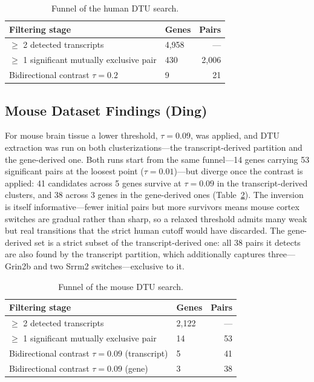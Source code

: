 \begin{table}[htbp]
    \centering
    \begin{tabular}{llr}
        \toprule
        Filtering stage & Genes & Pairs \\
        \midrule
        $\geq$ 2 detected transcripts & 4,958 & --- \\
        $\geq$ 1 significant mutually exclusive pair & 430 & 2,006 \\
        Bidirectional contrast $\tau = 0.2$ & 9 & 21 \\
        \bottomrule
    \end{tabular}
    \caption{Funnel of the human DTU search.}
    \label{tab:dtu-funnel}
\end{table}

\subsection*{Mouse Dataset Findings (Ding)}\label{sec:results-mouse}

For mouse brain tissue a lower threshold, $\tau = 0.09$, was applied, and DTU extraction was run on both clusterizations---the transcript-derived partition and the gene-derived one. Both runs start from the same funnel---14 genes carrying 53 significant pairs at the loosest point ($\tau = 0.01$)---but diverge once the contrast is applied: 41 candidates across 5 genes survive at $\tau = 0.09$ in the transcript-derived clusters, and 38 across 3 genes in the gene-derived ones (Table~\ref{tab:dtu-funnel-mouse}). The inversion is itself informative---fewer initial pairs but more survivors means mouse cortex switches are gradual rather than sharp, so a relaxed threshold admits many weak but real transitions that the strict human cutoff would have discarded. The gene-derived set is a strict subset of the transcript-derived one: all 38 pairs it detects are also found by the transcript partition, which additionally captures three---Grin2b and two Srrm2 switches---exclusive to it.

\begin{table}[htbp]
    \centering
    \begin{tabular}{llr}
        \toprule
        Filtering stage & Genes & Pairs \\
        \midrule
        $\geq$ 2 detected transcripts & 2,122 & --- \\
        $\geq$ 1 significant mutually exclusive pair & 14 & 53 \\
        Bidirectional contrast $\tau = 0.09$ (transcript) & 5 & 41 \\
        Bidirectional contrast $\tau = 0.09$ (gene) & 3 & 38 \\
        \bottomrule
    \end{tabular}
    \caption{Funnel of the mouse DTU search.}
    \label{tab:dtu-funnel-mouse}
\end{table}

